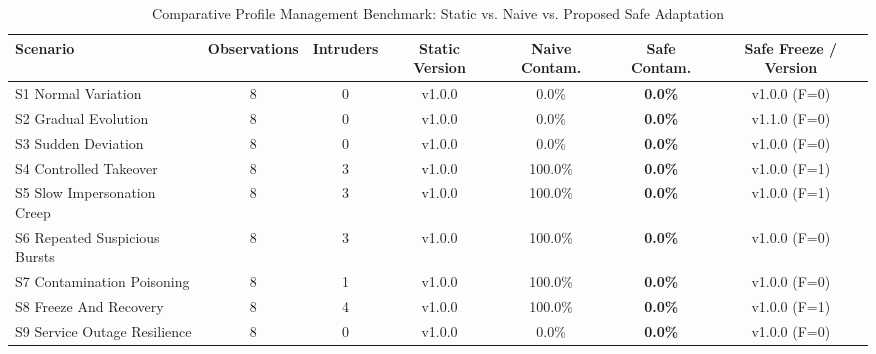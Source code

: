 \begin{table}[t]
\centering
\caption{Comparative Profile Management Benchmark: Static vs. Naive vs. Proposed Safe Adaptation}
\label{tab:adaptation_comparison}
\begin{tabular}{lcccccc}
\toprule
\textbf{Scenario} & \textbf{Observations} & \textbf{Intruders} & \textbf{Static Version} & \textbf{Naive Contam.} & \textbf{Safe Contam.} & \textbf{Safe Freeze / Version} \\
\midrule
S1 Normal Variation & 8 & 0 & v1.0.0 & 0.0\% & \textbf{0.0\%} & v1.0.0 (F=0) \\
S2 Gradual Evolution & 8 & 0 & v1.0.0 & 0.0\% & \textbf{0.0\%} & v1.1.0 (F=0) \\
S3 Sudden Deviation & 8 & 0 & v1.0.0 & 0.0\% & \textbf{0.0\%} & v1.0.0 (F=0) \\
S4 Controlled Takeover & 8 & 3 & v1.0.0 & 100.0\% & \textbf{0.0\%} & v1.0.0 (F=1) \\
S5 Slow Impersonation Creep & 8 & 3 & v1.0.0 & 100.0\% & \textbf{0.0\%} & v1.0.0 (F=1) \\
S6 Repeated Suspicious Bursts & 8 & 3 & v1.0.0 & 100.0\% & \textbf{0.0\%} & v1.0.0 (F=0) \\
S7 Contamination Poisoning & 8 & 1 & v1.0.0 & 100.0\% & \textbf{0.0\%} & v1.0.0 (F=0) \\
S8 Freeze And Recovery & 8 & 4 & v1.0.0 & 100.0\% & \textbf{0.0\%} & v1.0.0 (F=1) \\
S9 Service Outage Resilience & 8 & 0 & v1.0.0 & 0.0\% & \textbf{0.0\%} & v1.0.0 (F=0) \\
\bottomrule
\end{tabular}
\end{table}
